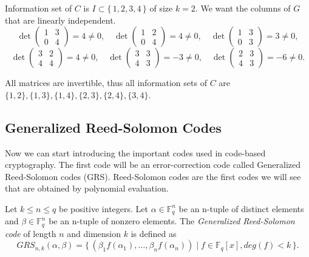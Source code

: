 \begin{solution}
    Information set of $C$ is $I \subset \{\,1,2,3,4\,\}$ of size $k=2$. We want the columns of $G$ that are linearly independent.\\

\begin{equation*}
    \det\begin{pmatrix}
        1&3\\0&4
    \end{pmatrix}=4\neq0, \quad
    \det\begin{pmatrix}
        1&2\\0&4
    \end{pmatrix}=4\neq0, \quad
    \det\begin{pmatrix}
        1&3\\0&3
    \end{pmatrix}=3\neq0,
\end{equation*}
\begin{equation*}
    \det\begin{pmatrix}
        3&2\\4&4
    \end{pmatrix}=4\neq0, \quad
    \det\begin{pmatrix}
        3&3\\4&3
    \end{pmatrix}=-3\neq0, \quad
    \det\begin{pmatrix}
        2&3\\4&3
    \end{pmatrix}=-6\neq0.
\end{equation*}
    
All matrices are invertible, thus all information sets of $C$ are $\{1,2\},\{1,3\},\{1,4\},\{2,3\},\{2,4\},\{3,4\}.$
\end{solution}

\subsection{Generalized Reed-Solomon Codes}
Now we can start introducing the important codes used in code-based cryptography. The first code will be an error-correction code called Generalized Reed-Solomon codes (GRS). Reed-Solomon codes are the first codes we will see that are obtained by polynomial evaluation.

\begin{definition}
Let $k \leq n \leq q$ be positive integers. Let $\alpha \in \mathbb{F}_q^n$ be an n-tuple of distinct elements and $\beta \in \mathbb{F}_q^n$ be an n-tuple of nonzero elements. The \textit{Generalized Reed-Solomon code} of length $n$ and dimension $k$ is defined as
\[
GRS_{n,k}(\alpha, \beta) = \{\, (\beta_1f(\alpha_1), \dots, \beta_nf(\alpha_n)) \mid f \in \mathbb{F}_q[x], deg(f) < k \,\}.
\]
\end{definition}

